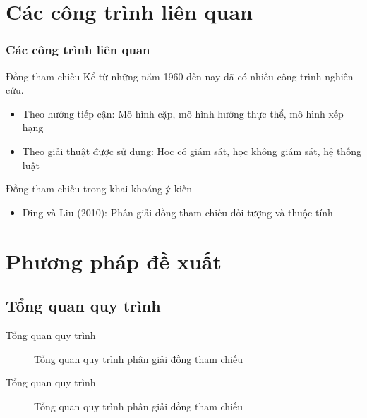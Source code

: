 \documentclass[9pt,xcolor=table,hyperref=unicode]{beamer}
\begin{document}
	\section{Các công trình liên quan}
	\begin{frame}
		\frametitle{Các công trình liên quan}
		\begin{block}{Đồng tham chiếu}
			Kể từ những năm 1960 đến nay đã có nhiều công trình nghiên cứu.
			\begin{itemize}
				\item{Theo hướng tiếp cận: Mô hình cặp, mô hình hướng thực thể, mô hình xếp hạng}
				\item{Theo giải thuật được sử dụng: Học có giám sát, học không giám sát, hệ thống luật}
			\end{itemize}
		\end{block}
		\begin{block}{Đồng tham chiếu trong khai khoáng ý kiến}
			\begin{itemize}				
				\item{Ding và Liu (2010): Phân giải đồng tham chiếu đối tượng và thuộc tính \footnotemark}
			\end{itemize}
		\end{block}		
	\end{frame}

	\section{Phương pháp đề xuất}
	\subsection{Tổng quan quy trình}
	\begin{frame}{Tổng quan quy trình}		
		\begin{figure}[H]
			\LARGE 
			\centering				
			\resizebox{100mm}{!}{}
			\caption{Tổng quan quy trình phân giải đồng tham chiếu}									
		\end{figure}
	\end{frame}	

	\begin{frame}{Tổng quan quy trình}		
		\begin{figure}[H]
			\LARGE 
			\centering				
			\resizebox{100mm}{!}{}
			\caption{Tổng quan quy trình phân giải đồng tham chiếu}									
		\end{figure}
	\end{frame}
\end{document}

